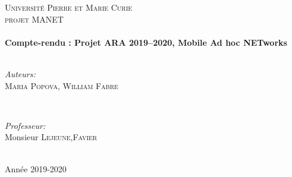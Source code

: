 \documentclass[11pt,a4paper,sans]{report}
\begin{document}
\begin{titlepage}

	\center %


	\textsc{\LARGE Université Pierre et Marie Curie}\\[1.5cm] %
	\textsc{\Large projet MANET}\\[0.5cm] %

	\vfill
	\HRule \\[0.4cm]
	{ \huge \bfseries Compte-rendu : Projet ARA 2019–2020, Mobile Ad hoc NETworks }\\[0.4cm] 
	\HRule \\[1.5cm]
	\vfill

	\begin{minipage}{0.4\textwidth}
		\begin{flushleft} \large
			\emph{Auteurs:}\\
			\textsc{Maria Popova, William Fabre} 
		\end{flushleft}
	\end{minipage}
	~
	\begin{minipage}{0.4\textwidth}
		\begin{flushright} \large
			\emph{Professeur:} \\
			Monsieur \textsc{Lejeune},\textsc{Favier}
		\end{flushright}
	\end{minipage}\\[2cm]


	{\large Année 2019-2020}\\[2cm] %

\end{titlepage}
\end{document}
